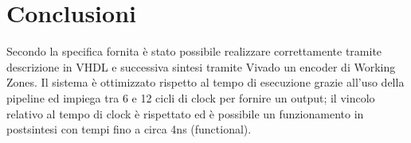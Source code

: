 
\section{Conclusioni}

Secondo la specifica fornita \`e stato possibile realizzare correttamente tramite descrizione in VHDL e successiva sintesi tramite Vivado un encoder di Working Zones. Il sistema \`e ottimizzato rispetto al tempo di esecuzione grazie all'uso della pipeline ed impiega tra 6 e 12 cicli di clock per fornire un output; il vincolo relativo al tempo di clock \`e rispettato ed \`e possibile un funzionamento in postsintesi con tempi fino a circa 4ns (functional).   

